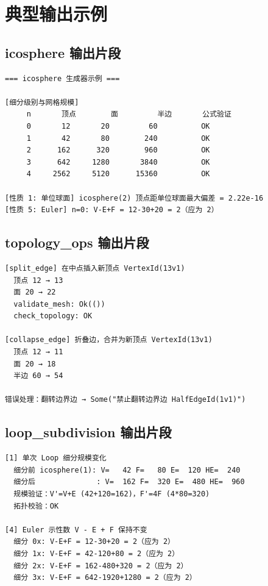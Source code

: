 \documentclass[11pt,a4paper]{article}
\begin{document}
\section{典型输出示例}

\subsection{icosphere 输出片段}

\begin{lstlisting}
=== icosphere 生成器示例 ===

[细分级别与网格规模]
     n       顶点        面         半边       公式验证
     0       12       20         60          OK
     1       42       80        240          OK
     2      162      320        960          OK
     3      642     1280       3840          OK
     4     2562     5120      15360          OK

[性质 1: 单位球面] icosphere(2) 顶点距单位球面最大偏差 = 2.22e-16
[性质 5: Euler] n=0: V-E+F = 12-30+20 = 2（应为 2）
\end{lstlisting}

\subsection{topology\_ops 输出片段}

\begin{lstlisting}
[split_edge] 在中点插入新顶点 VertexId(13v1)
  顶点 12 → 13
  面 20 → 22
  validate_mesh: Ok(())
  check_topology: OK

[collapse_edge] 折叠边，合并为新顶点 VertexId(13v1)
  顶点 12 → 11
  面 20 → 18
  半边 60 → 54

错误处理：翻转边界边 → Some("禁止翻转边界边 HalfEdgeId(1v1)")
\end{lstlisting}

\subsection{loop\_subdivision 输出片段}

\begin{lstlisting}
[1] 单次 Loop 细分规模变化
  细分前 icosphere(1): V=   42 F=   80 E=  120 HE=  240
  细分后              : V=  162 F=  320 E=  480 HE=  960
  规模验证：V'=V+E (42+120=162)，F'=4F (4*80=320)
  拓扑校验：OK

[4] Euler 示性数 V - E + F 保持不变
  细分 0x: V-E+F = 12-30+20 = 2（应为 2）
  细分 1x: V-E+F = 42-120+80 = 2（应为 2）
  细分 2x: V-E+F = 162-480+320 = 2（应为 2）
  细分 3x: V-E+F = 642-1920+1280 = 2（应为 2）
\end{lstlisting}
\end{document}
